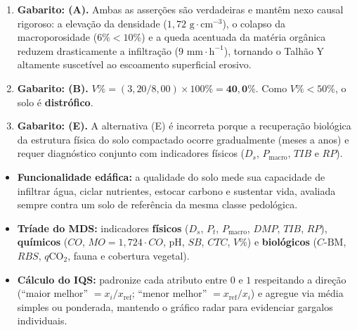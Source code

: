 \begin{boxGabarito}
\begin{enumerate}[leftmargin=1.6em, itemsep=4pt]
  \item \textbf{Gabarito: (A).} Ambas as asserções são verdadeiras e mantêm nexo causal rigoroso: a elevação da densidade ($1{,}72\text{ g}\cdot\text{cm}^{-3}$), o colapso da macroporosidade ($6\% < 10\%$) e a queda acentuada da matéria orgânica reduzem drasticamente a infiltração ($9\text{ mm}\cdot\text{h}^{-1}$), tornando o Talhão Y altamente suscetível ao escoamento superficial erosivo.
  \item \textbf{Gabarito: (B).} $V\% = (3{,}20 / 8{,}00)\times 100\% = \mathbf{40{,}0\%}$. Como $V\% < 50\%$, o solo é \textbf{distrófico}.
  \item \textbf{Gabarito: (E).} A alternativa (E) é incorreta porque a recuperação biológica da estrutura física do solo compactado ocorre gradualmente (meses a anos) e requer diagnóstico conjunto com indicadores físicos ($D_s$, $P_{\text{macro}}$, $TIB$ e $RP$).
\end{enumerate}
\end{boxGabarito}

\begin{boxResumo}
\begin{itemize}[leftmargin=1.4em, itemsep=2.5pt]
  \item \textbf{Funcionalidade edáfica:} a qualidade do solo mede sua capacidade de infiltrar água, ciclar nutrientes, estocar carbono e sustentar vida, avaliada sempre contra um solo de referência da mesma classe pedológica.
  \item \textbf{Tríade do MDS:} indicadores \textbf{físicos} ($D_s$, $P_t$, $P_{\text{macro}}$, $DMP$, $TIB$, $RP$), \textbf{químicos} ($CO$, $MO = 1{,}724 \cdot CO$, pH, $SB$, $CTC$, $V\%$) e \textbf{biológicos} ($C\text{-BM}$, $RBS$, $q\text{CO}_2$, fauna e cobertura vegetal).
  \item \textbf{Cálculo do IQS:} padronize cada atributo entre $0$ e $1$ respeitando a direção (``maior melhor'' $= x_i/x_{\text{ref}}$; ``menor melhor'' $= x_{\text{ref}}/x_i$) e agregue via média simples ou ponderada, mantendo o gráfico radar para evidenciar gargalos individuais.
\end{itemize}
\end{boxResumo}

